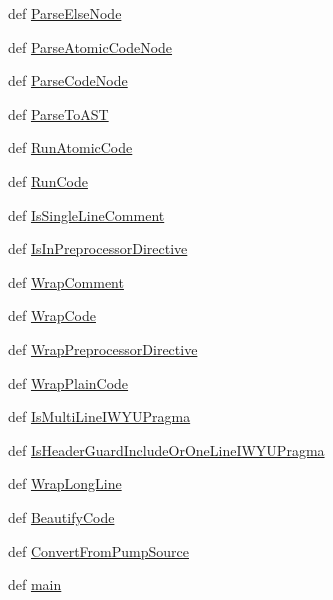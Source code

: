 \begin{DoxyCompactItemize}
\item 
def \hyperlink{namespacepump_a7c097cb9e4096fd75d1fed9d26b87bfd}{Parse\-Else\-Node}
\item 
def \hyperlink{namespacepump_a40224eb47d27ea5626c29081d0d533f2}{Parse\-Atomic\-Code\-Node}
\item 
def \hyperlink{namespacepump_aa889d697c651115f8eb880d5b9dd7120}{Parse\-Code\-Node}
\item 
def \hyperlink{namespacepump_a2bb33f428498bc39017e60acc4a28593}{Parse\-To\-A\-S\-T}
\item 
def \hyperlink{namespacepump_af8495f590c6140bb8fe23807f7d0f09e}{Run\-Atomic\-Code}
\item 
def \hyperlink{namespacepump_ac1cc678dd90b4e98e9e6757c2d8ed99a}{Run\-Code}
\item 
def \hyperlink{namespacepump_adba518f226bf14b3688e1dbccb9f467c}{Is\-Single\-Line\-Comment}
\item 
def \hyperlink{namespacepump_ad91ca1836c36dc3e1e0ad44530898a3c}{Is\-In\-Preprocessor\-Directive}
\item 
def \hyperlink{namespacepump_a8677a2e43df12f97c0264c11484c93ad}{Wrap\-Comment}
\item 
def \hyperlink{namespacepump_a47b13e91e95ce5ad82778b919b51dc0b}{Wrap\-Code}
\item 
def \hyperlink{namespacepump_a6792a75371c73ca5d1033104b41baf9e}{Wrap\-Preprocessor\-Directive}
\item 
def \hyperlink{namespacepump_aa10f49653a1076dd726c717e6498e38c}{Wrap\-Plain\-Code}
\item 
def \hyperlink{namespacepump_a8e58db1543543ced50a85aaef8ec8f2f}{Is\-Multi\-Line\-I\-W\-Y\-U\-Pragma}
\item 
def \hyperlink{namespacepump_abcda5ea8e15086c9bf4f8f995f72c284}{Is\-Header\-Guard\-Include\-Or\-One\-Line\-I\-W\-Y\-U\-Pragma}
\item 
def \hyperlink{namespacepump_addffcaf4dbb430aaeb7193cca96c0422}{Wrap\-Long\-Line}
\item 
def \hyperlink{namespacepump_a57fae516f7cf25ad72a7074e2b0c9d3c}{Beautify\-Code}
\item 
def \hyperlink{namespacepump_ae4a7ae18fdc10f1460aace6726295f36}{Convert\-From\-Pump\-Source}
\item 
def \hyperlink{namespacepump_a7b440d502623497b7d8cfcbb03a7f8c5}{main}
\end{DoxyCompactItemize}
